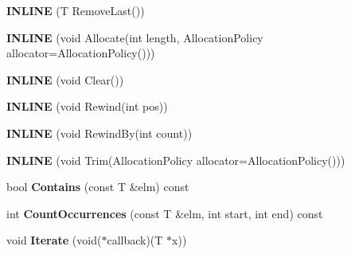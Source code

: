 \begin{DoxyCompactItemize}
\item 
\hypertarget{classv8_1_1internal_1_1_list_a7dd35dbbdfc6f0b4a0dae4a8dd38e1be}{}{\bfseries I\+N\+L\+I\+N\+E} (T Remove\+Last())\label{classv8_1_1internal_1_1_list_a7dd35dbbdfc6f0b4a0dae4a8dd38e1be}

\item 
\hypertarget{classv8_1_1internal_1_1_list_a90d0eceae7ba2ca5d8788f3de42c4568}{}{\bfseries I\+N\+L\+I\+N\+E} (void Allocate(int length, Allocation\+Policy allocator=Allocation\+Policy()))\label{classv8_1_1internal_1_1_list_a90d0eceae7ba2ca5d8788f3de42c4568}

\item 
\hypertarget{classv8_1_1internal_1_1_list_a775bd901890c7b639652620ddd9dcafc}{}{\bfseries I\+N\+L\+I\+N\+E} (void Clear())\label{classv8_1_1internal_1_1_list_a775bd901890c7b639652620ddd9dcafc}

\item 
\hypertarget{classv8_1_1internal_1_1_list_a79c274928631e75ec2568f51141721bd}{}{\bfseries I\+N\+L\+I\+N\+E} (void Rewind(int pos))\label{classv8_1_1internal_1_1_list_a79c274928631e75ec2568f51141721bd}

\item 
\hypertarget{classv8_1_1internal_1_1_list_a3f3d1e9d330bef9aeff65bc4a0fa5f89}{}{\bfseries I\+N\+L\+I\+N\+E} (void Rewind\+By(int count))\label{classv8_1_1internal_1_1_list_a3f3d1e9d330bef9aeff65bc4a0fa5f89}

\item 
\hypertarget{classv8_1_1internal_1_1_list_ac424eb47de7ac71f1707ab9c4e41fd48}{}{\bfseries I\+N\+L\+I\+N\+E} (void Trim(Allocation\+Policy allocator=Allocation\+Policy()))\label{classv8_1_1internal_1_1_list_ac424eb47de7ac71f1707ab9c4e41fd48}

\item 
\hypertarget{classv8_1_1internal_1_1_list_a268fad971190fd4ff7669b06bfe5118e}{}bool {\bfseries Contains} (const T \&elm) const \label{classv8_1_1internal_1_1_list_a268fad971190fd4ff7669b06bfe5118e}

\item 
\hypertarget{classv8_1_1internal_1_1_list_a6ea372eb008b89abd2b9f71ca7f7a17d}{}int {\bfseries Count\+Occurrences} (const T \&elm, int start, int end) const \label{classv8_1_1internal_1_1_list_a6ea372eb008b89abd2b9f71ca7f7a17d}

\item 
\hypertarget{classv8_1_1internal_1_1_list_a6f1953357c2a1d4a562b522bbfa25e08}{}void {\bfseries Iterate} (void($\ast$callback)(T $\ast$x))\label{classv8_1_1internal_1_1_list_a6f1953357c2a1d4a562b522bbfa25e08}


\end{DoxyCompactItemize}
